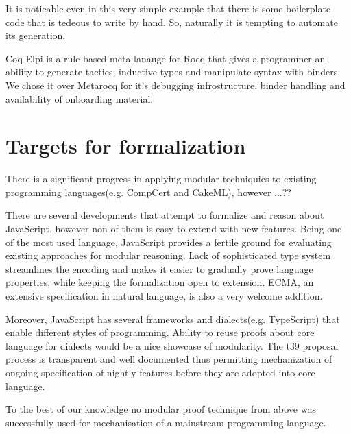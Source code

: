 \documentclass[sigplan,nonacm]{acmart}
\begin{document}
It is noticable even in this very simple example that there is some boilerplate code that is tedeous to write by hand. 
So, naturally it is tempting to automate its generation. 

Coq-Elpi\cite{tassi2025elpi} is a rule-based meta-lanauge for Rocq\cite{the_coq_development_team_2024_14542673} that gives a programmer an ability to generate tactics, inductive types and manipulate syntax with binders. 
We chose it over Metarocq for it's debugging infrostructure, binder handling and availability of onboarding material.

\section{Targets for formalization}

There is a significant progress in applying modular techniquies to existing programming languages(e.g. CompCert and CakeML\cite{ebresafe2025certified}), however ...??


There are several\cite{guha2010essence}\cite{bodin2014trusted} developments that attempt to formalize and reason about JavaScript, however non of them is easy to extend with new features.
Being one of the most used language, JavaScript provides a fertile ground for evaluating existing approaches for modular reasoning. 
Lack of sophisticated type system streamlines the encoding and makes it easier to gradually prove language properties, while keeping the formalization open to extension.
ECMA\cite{ECMA}, an extensive specification in natural language, is also a very welcome addition.

Moreover, JavaScript has several frameworks\cite{React} and dialects(e.g. TypeScript) that enable different styles of programming. 
Ability to reuse proofs about core language for dialects would be a nice showcase of modularity. 
The t39 proposal process\cite{t39} is transparent and well documented thus permitting mechanization of ongoing specification of nightly features before they are adopted into core language.


To the best of our knowledge no modular proof technique from above was successfully used for mechanisation of a mainstream programming language.
\end{document}
